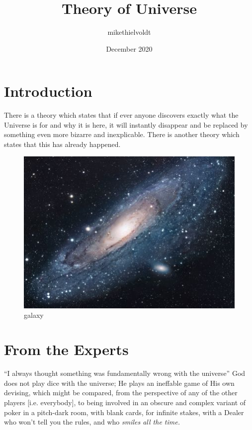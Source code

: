 \documentclass{article}
\title{Theory of Universe}
\author{mikethielvoldt }
\date{December 2020}
\begin{document}
\maketitle

\section{Introduction}
There is a theory which states that if ever anyone discovers exactly what the Universe is for and why it is here, it will instantly disappear and be replaced by something even more bizarre and inexplicable.
There is another theory which states that this has already happened.



\begin{figure}[h!]
\centering
\includegraphics[scale=1.7]{galaxy}
\caption{galaxy}
\label{fig:galaxy}
\end{figure}

\section{From the Experts}
``I always thought something was fundamentally wrong with the universe'' \citep{adams1995hitchhiker}\newline
\newline
God does not play dice with the universe; He plays an ineffable game of His own devising, which might be compared, from the perspective of any of the other players [i.e. everybody], to being involved in an obscure and complex variant of poker in a pitch-dark room, with blank cards, for infinite stakes, with a Dealer who won't tell you the rules, and who \em{smiles all the time}.



\end{document}
